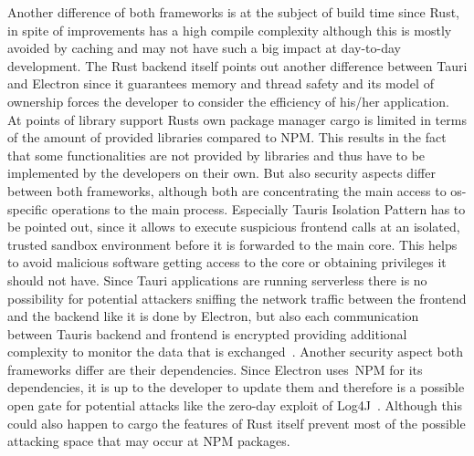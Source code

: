 Another difference of both frameworks is at the subject of build time since Rust, in spite of improvements has a high compile complexity although this is mostly avoided by caching and may not have such a big impact
at day-to-day development.
The Rust backend itself points out another difference between Tauri and Electron since it guarantees memory and thread safety and its model of ownership forces the developer to consider the efficiency of his/her application.
At points of library support Rusts own package manager cargo is limited in terms of the amount of provided libraries compared to \ac{NPM}.
This results in the fact that some functionalities are not provided by libraries and thus have to be implemented by the developers on their own.
But also security aspects differ between both frameworks, although both are concentrating the main access to os-specific operations to the main process.
Especially Tauris Isolation Pattern has to be pointed out, since it allows to execute suspicious frontend calls at an isolated, trusted sandbox environment before it is forwarded to the main core.
This helps to avoid malicious software getting access to the core or obtaining privileges it should not have.
Since Tauri applications are running serverless there is no possibility for potential attackers sniffing the network traffic between the frontend and the backend like it is done by Electron, but also each communication between Tauris backend and
frontend is encrypted providing additional complexity to monitor the data that is exchanged~\cite{tauri}.
Another security aspect both frameworks differ are their dependencies.
Since Electron uses~\ac{NPM} for its dependencies, it is up to the developer to update them and therefore is a possible open gate for potential attacks like the zero-day exploit of Log4J~\cite{bsi}.
Although this could also happen to cargo the features of Rust itself prevent most of the possible attacking space that may occur at \ac{NPM} packages.



